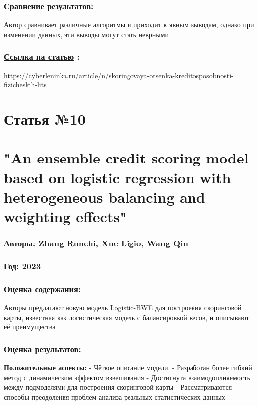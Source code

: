 \documentclass[a4paper,14pt]{article}
\begin{document}
\subsubsection*{\underline{Сравнение результатов}:}
Автор сравнивает различные алгоритмы и приходит к явным выводам, однако при изменении данных, эти выводы могут стать неврными
\subsubsection*{\underline{Ссылка на статью} :}
https://cyberleninka.ru/article/n/skoringovaya-otsenka-kreditosposobnosti-fizicheskih-lits

\newpage



\section*{Статья №10}
\section*{"An ensemble credit scoring model based on logistic regression with heterogeneous balancing and weighting effects"}
\subsubsection*{Авторы: Zhang Runchi, Xue Ligio, Wang Qin}
\subsubsection*{Год: 2023}
\subsubsection*{\underline{Оценка содержания}:}
Авторы предлагают новую модель Logistic-BWE для построения скоринговой карты, известная как логистическая модель с балансировкой весов, и описывают её преимущества
\subsubsection*{\underline{Оценка результатов}:}
\textbf{Положительные аспекты:} \newline
- Чёткое описание модели. \newline
- Разработан более гибкий метод с динамическим эффектом взвешивания \newline
- Достигнута взаимодоплняемость между подмоделями для построения скоринговой карты \newline
- Рассматриваются способы преодоления проблем анализа реальных статистических данных
\end{document}

